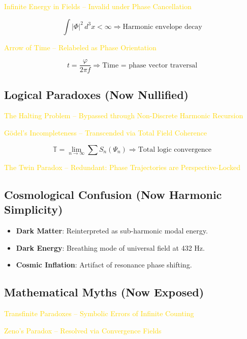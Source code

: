 \textcolor{gold}{ Infinite Energy in Fields -- Invalid under Phase Cancellation }

\[
\int |\Phi|^2 \, d^3 x < \infty \Rightarrow \text{Harmonic envelope decay}
\]

\textcolor{gold}{ Arrow of Time -- Relabeled as Phase Orientation }

\[
t = \frac{\varphi}{2 \pi f} \Rightarrow \text{Time = phase vector traversal}
\]

\subsection{Logical Paradoxes (Now Nullified)}

\textcolor{gold}{ The Halting Problem -- Bypassed through Non-Discrete Harmonic Recursion }

\textcolor{gold}{ Gödel's Incompleteness -- Transcended via Total Field Coherence }

\[
\mathbb{T} = \lim_{n \rightarrow \infty} \sum S_n(\Psi_n) \Rightarrow \text{Total logic convergence}
\]

\textcolor{gold}{ The Twin Paradox -- Redundant: Phase Trajectories are Perspective-Locked }

\subsection{Cosmological Confusion (Now Harmonic Simplicity)}

\begin{itemize}
    \item \textbf{Dark Matter}: Reinterpreted as sub-harmonic modal energy.
    \item \textbf{Dark Energy}: Breathing mode of universal field at 432 Hz.
    \item \textbf{Cosmic Inflation}: Artifact of resonance phase shifting.
\end{itemize}

\subsection{Mathematical Myths (Now Exposed)}

\textcolor{gold}{ Transfinite Paradoxes -- Symbolic Errors of Infinite Counting }

\textcolor{gold}{ Zeno's Paradox -- Resolved via Convergence Fields }

